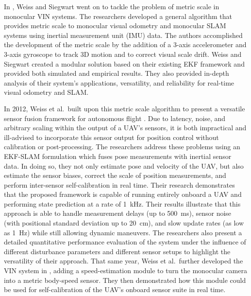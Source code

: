 In \cite{Weiss2011_2}, Weiss and Siegwart went on to tackle the problem of metric scale in monocular VIN systems. The researchers developed a general algorithm that provides metric scale to monocular visual odometry and monocular SLAM systems using inertial measurement unit (IMU) data. The authors accomplished the development of the metric scale by the addition of a 3-axis accelerometer and 3-axis gyroscope to track 3D motion and to correct visual scale drift. Weiss and Siegwart created a modular solution based on their existing EKF framework and provided both simulated and empirical results. They also provided in-depth analysis of their system's applications, versatility, and reliability for real-time visual odometry and SLAM. 

In 2012, Weiss et al.\ built upon this metric scale algorithm to present a versatile sensor fusion framework for autonomous flight \cite{Weiss2012}. Due to latency, noise, and arbitrary scaling within the output of a UAV's sensors, it is both impractical and ill-advised to incorporate this sensor output for position control without calibration or post-processing. The researchers address these problems using an EKF-SLAM formulation which fuses pose measurements with inertial sensor data. In doing so, they not only estimate pose and velocity of the UAV, but also estimate the sensor biases, correct the scale of position measurements, and perform inter-sensor self-calibration in real time. Their research demonstrates that the proposed framework is capable of running entirely onboard a UAV and performing state prediction at a rate of 1~kHz. Their results illustrate that this approach is able to handle measurement delays (up to 500~ms), sensor noise (with positional standard deviation up to 20~cm), and slow update rates (as low as 1~Hz) while still allowing dynamic maneuvers. The researchers also present a detailed quantitative performance evaluation of the system under the influence of different disturbance parameters and different sensor setups to highlight the versatility of their approach. That same year, Weiss et al.\ further developed the VIN system in \cite{Weiss2012_2}, adding a speed-estimation module to turn the monocular camera into a metric body-speed sensor. They then demonstrated how this module could be used for self-calibration of the UAV's onboard sensor suite in real time.

